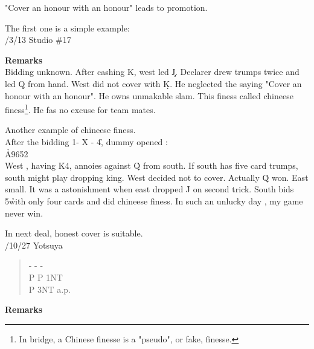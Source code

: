 "Cover an honour with an honour" leads to promotion.

The first one is a simple example:\\


/3/13 Studio  \#17
\begin{quote}
%
  {}%
  {}
  {}%
  {}%
\end{quote}
{\bf Remarks}\\

Bidding unknown. After cashing \s K, west led \c J.
Declarer drew trumps twice and led \d Q from hand.
West did not cover with \d K. He neglected the
saying "Cover an honour with an honour".
He owns unmakable slam. This finess called chineese
finess\footnote{
In bridge, a Chinese finesse is a "pseudo", or fake, finesse.
}. He fas no excuse for team mates.


Another example of chineese finess.\\
After the bidding 1\s - X - 4\h , dummy opened :\\
\qquad \qquad \h A9652\\
West , having \h K4,  annoies against \h Q from south.
If south has five card trumps, south might play dropping king.
West decided not to cover. Actually \h Q won.  East small. 
It was a astonishment when east dropped \h J on second trick.
South bids 5\h with only four cards and did chineese finess.
In such an unlucky day , my game never win.

\vspace{0.5cm}
In next deal, honest cover is suitable.\\
/10/27 Yotsuya  
\begin{quote}
%
  {}%
  {}
  {}%
  {}%
\end{quote}
\begin{quote}
\begin{bidding}
- \> -  \> - \h \\
P \s \> P \> 1NT\\
P \>  3NT \> a.p.
\end{bidding}
\end{quote}
{\bf Remarks}\\


